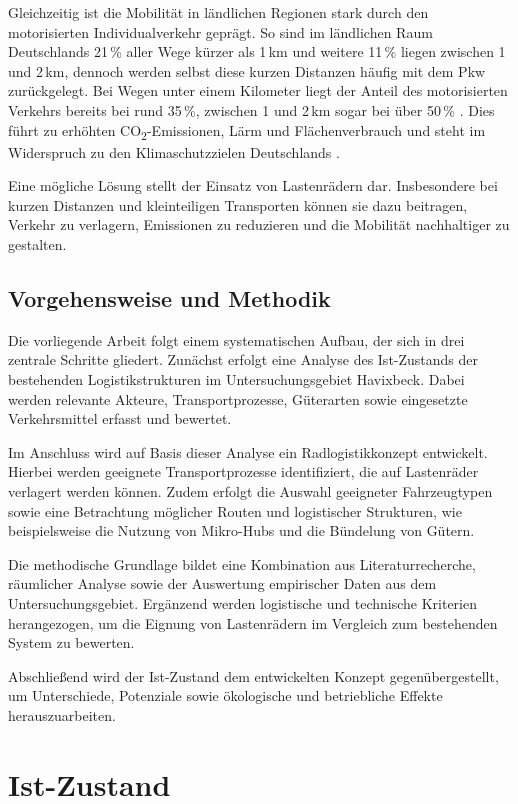 \documentclass[a4paper,11pt,parskip=half,numbers=noenddot]{scrreprt}
\begin{document}
Gleichzeitig ist die Mobilität in ländlichen Regionen stark durch den motorisierten Individualverkehr geprägt. So sind im ländlichen Raum Deutschlands 21\,\% aller Wege kürzer als 1\,km und weitere 11\,\% liegen zwischen 1 und 2\,km, dennoch werden selbst diese kurzen Distanzen häufig mit dem Pkw zurückgelegt. Bei Wegen unter einem Kilometer liegt der Anteil des motorisierten Verkehrs bereits bei rund 35\,\%, zwischen 1 und 2\,km sogar bei über 50\,\% \parencite{BMEL2023}. Dies führt zu erhöhten CO\textsubscript{2}-Emissionen, Lärm und Flächenverbrauch und steht im Widerspruch zu den Klimaschutzzielen Deutschlands \parencite{BMEL2023,KSG2019}.

Eine mögliche Lösung stellt der Einsatz von Lastenrädern dar. Insbesondere bei kurzen Distanzen und kleinteiligen Transporten können sie dazu beitragen, Verkehr zu verlagern, Emissionen zu reduzieren und die Mobilität nachhaltiger zu gestalten.

\section{Vorgehensweise und Methodik}

Die vorliegende Arbeit folgt einem systematischen Aufbau, der sich in drei zentrale Schritte gliedert. Zunächst erfolgt eine Analyse des Ist-Zustands der bestehenden Logistikstrukturen im Untersuchungsgebiet Havixbeck. Dabei werden relevante Akteure, Transportprozesse, Güterarten sowie eingesetzte Verkehrsmittel erfasst und bewertet.

Im Anschluss wird auf Basis dieser Analyse ein Radlogistikkonzept entwickelt. Hierbei werden geeignete Transportprozesse identifiziert, die auf Lastenräder verlagert werden können. Zudem erfolgt die Auswahl geeigneter Fahrzeugtypen sowie eine Betrachtung möglicher Routen und logistischer Strukturen, wie beispielsweise die Nutzung von Mikro-Hubs und die Bündelung von Gütern.

Die methodische Grundlage bildet eine Kombination aus Literaturrecherche, räumlicher Analyse sowie der Auswertung empirischer Daten aus dem Untersuchungsgebiet. Ergänzend werden logistische und technische Kriterien herangezogen, um die Eignung von Lastenrädern im Vergleich zum bestehenden System zu bewerten.

Abschließend wird der Ist-Zustand dem entwickelten Konzept gegenübergestellt, um Unterschiede, Potenziale sowie ökologische und betriebliche Effekte herauszuarbeiten.

\chapter{Ist-Zustand}
\end{document}
